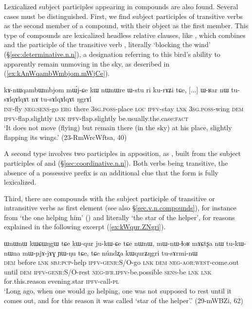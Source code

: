 Lexicalized subject participles appearing in compounds are also found. Several cases must be distinguished. First, we find subject participles of transitive verbs as the second member of a compound, with their object as the first member. This type of compounds are lexicalized headless relative clauses, like , which combines   and the participle   of the transitive verb , literally `blocking the wind'   (§\ref{sec:determinative.n.n}), a designation referring to this bird's ability to apparently remain unmoving in the sky, as described in (\ref{ex:kAnWqambWmbjom.mWjCe}).

\begin{exe}
\ex \label{ex:kAnWqambWmbjom.mWjCe}
 \gll  kɤ-nɯqambɯmbjom mɯ́j-ɕe kɯ nɯnɯre ɯ-stu ri ku-rɤʑi tɕe, [...] ɯ-ʁar nɯ tu-sɤlqɤlqɤt nɤ tu-sɤlqɤlqɤt ŋgrɤl  \\
 \textsc{inf}-fly \textsc{neg}:\textsc{sens}-go \textsc{erg} there \textsc{3sg}.\textsc{poss}-place \textsc{loc} \textsc{ipfv}-stay \textsc{lnk} { } \textsc{3sg}.\textsc{poss}-wing \textsc{dem} \textsc{ipfv}-flap.slightly \textsc{lnk}  \textsc{ipfv}-flap.slightly be.usually.the.case:\textsc{fact} \\
 \glt `It does not move (flying) but remain there (in the sky) at his place, slightly flapping its wings.' (23-RmWrcWftsa, 40)
\end{exe}

A second type involves two participles in apposition, as , built from the subject participles of  and   (§\ref{sec:coordinative.n.n}). Both verbs being transitive, the absence of a possessive prefix  is an additional clue that the form is fully lexicalized.

Third, there are compounds with the subject participle of transitive or intransitive verbs as first element (see also §\ref{sec.v.n.compounds}), for instance  from  `the one helping him' () and  literally `the star of the helper', for reasons explained in the following excerpt (\ref{ex:kWqur.ZNgri}).

\begin{exe}
\ex \label{ex:kWqur.ZNgri}
\gll ɯnɯnɯ kɯɕɯŋgɯ tɕe kɯ-qur ju-kɯ-ɕe tɕe nɯnɯ, mɯ-nɯ-ɬoʁ mɤɕtʂa nɯ tu-kɯ-nɯna mɯ-pjɤ-jɤɣ ɲɯ-ŋu tɕe,  tɕe núndʐa kɯqurʑŋgri tu-sɤrmi-nɯ \\
\textsc{dem} before \textsc{lnk} \textsc{sbj}:\textsc{pcp}-help \textsc{ipfv}-\textsc{genr}:S/O-go \textsc{lnk} \textsc{dem} \textsc{neg}-\textsc{aor}:\textsc{west}-come.out until \textsc{dem} \textsc{ipfv}-\textsc{genr}:S/O-rest \textsc{neg}-\textsc{ifr}.\textsc{ipfv}-be.possible \textsc{sens}-be \textsc{lnk} \textsc{lnk} for.this.reason evening.star \textsc{ipfv}-call-\textsc{pl} \\
\glt `Long ago, when one would go helping, one was not supposed to rest until it comes out, and for this reason it was called `star of the helper'.' (29-mWBZi, 62)
\end{exe}

